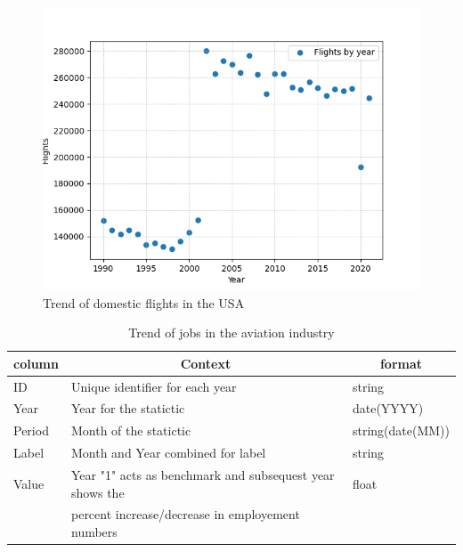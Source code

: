 \documentclass[
  man,floatsintext]{apa7}
\begin{document}
\begin{figure}

{\centering \includegraphics{./graphs/Count of flights} 

}

\caption{Trend of domestic flights in the USA}\label{fig:aviation-flights-image}
\end{figure}

\begin{table}[tbp]

\begin{center}
\begin{threeparttable}

\caption{\label{tab:aviation-jobs-schema}Trend of jobs in the aviation industry}

\begin{tabular}{lll}
\toprule
column & \multicolumn{1}{c}{Context} & \multicolumn{1}{c}{format}\\
\midrule
ID & Unique identifier for each year & string\\
Year & Year for the statictic & date(YYYY)\\
Period & Month of the statictic & string(date(MM))\\
Label & Month and Year combined for label & string\\
Value & Year "1" acts as benchmark and subsequest year shows the & float\\
 & percent increase/decrease in employement numbers & \\
\bottomrule
\end{tabular}

\end{threeparttable}
\end{center}

\end{table}
\end{document}

